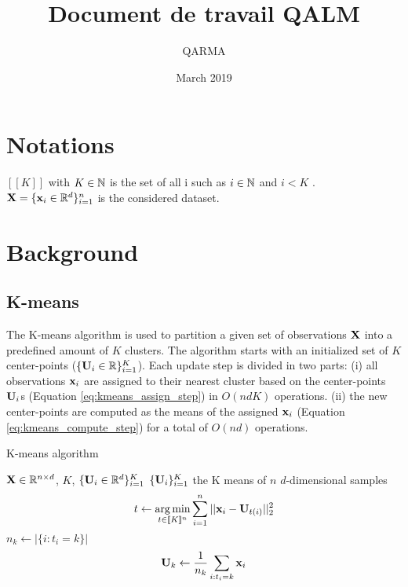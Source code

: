 \documentclass{article}
\title{Document de travail QALM}
\author{QARMA}
\date{March 2019}
\begin{document}
\maketitle

\section{Notations}

$[\![K]\!]$ with $K \in {\mathbb{N}}$ is the set of all i such as $i \in {\mathbb{N}}$ and $i < K$ . ${\mathbf{X}} = \{{\mathbf{x}}_i \in \mathbb{R}^d\}_{i=1}^n$ is the considered dataset.

\section{Background}

\subsection{K-means}

The K-means algorithm is used to partition a given set of observations ${\mathbf{X}}$ into a predefined amount of $K$ clusters. The algorithm starts with an initialized set of $K$ center-points ($\{{\mathbf{U}}_i \in \mathbb{R}\}_{i=1}^{K}$). Each update step is divided in two parts: (i) all observations ${\mathbf{x}}_i$ are assigned to their nearest cluster based on the center-points ${\mathbf{U}}_i$s (Equation \ref{eq:kmeans_assign_step}) in $O(ndK)$ operations. (ii) the new center-points are computed as the means of the assigned ${\mathbf{x}}_i$ (Equation \ref{eq:kmeans_compute_step}) for a total of $O(nd)$ operations.

\begin{algorithm}
\label{algo:kmeans}
\caption{K-means algorithm}
\begin{algorithmic}


\REQUIRE ${\mathbf{X}} \in \mathbb{R}^{n \times d}$, $K$, $\{{\mathbf{U}}_i \in \mathbb{R}^d\}_{i=1}^{K}$
\ENSURE $\{{\mathbf{U}}_i\}_{i=1}^{K}$ the K means of $n$ $d$-dimensional samples
\REPEAT
\STATE \begin{equation}
\label{eq:kmeans_assign_step}
t \leftarrow \operatorname*{arg\,min}_{t \in [\![K]\!]^n} \sum_{i=1}^{n} {||{\mathbf{x}}_i - {\mathbf{U}}_{t(i)}||_2^2}
\end{equation}
\STATE $n_k \leftarrow |\{i: t_i=k\}|$
\STATE \begin{equation}
\label{eq:kmeans_compute_step}
{\mathbf{U}}_k \leftarrow \frac{1}{n_k} \sum_{i: t_i = k} {{\mathbf{x}}_i}
\end{equation}
\ENDFOR
{}
\end{algorithmic}
\end{algorithm}
\end{document}
